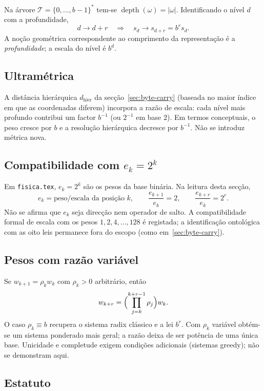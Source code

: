 \documentclass[11pt,a4paper]{article}
\begin{document}
Na árvore \(\mathcal T=\{0,\dots,b-1\}^*\) tem-se \(\operatorname{depth}(\omega)=|\omega|\). Identificando o nível \(d\) com a profundidade,
\[
d\to d+r\quad\Longrightarrow\quad s_d\to s_{d+r}=b^r s_d.
\]
A noção geométrica correspondente ao comprimento da representação é a \emph{profundidade}; a escala do nível é \(b^d\).

\subsection{Ultramétrica}

A distância hierárquica \(d_{\mathrm{hier}}\) da secção~\ref{sec:byte-carry} (baseada no maior índice em que as coordenadas diferem) incorpora a razão de escala: cada nível mais profundo contribui um factor \(b^{-1}\) (ou \(2^{-1}\) em base \(2\)). Em termos conceptuais, o peso cresce por \(b\) e a resolução hierárquica decresce por \(b^{-1}\). Não se introduz métrica nova.

\subsection{Compatibilidade com \(e_k=2^k\)}

Em \texttt{fisica.tex}, \(e_k=2^k\) são os pesos da base binária. Na leitura desta secção,
\[
e_k=\text{peso/escala da posição }k,\qquad
\frac{e_{k+1}}{e_k}=2,\qquad
\frac{e_{k+r}}{e_k}=2^r.
\]
Não se afirma que \(e_k\) seja direcção nem operador de salto. A compatibilidade formal de escala com os pesos \(1,2,4,\dots,128\) é registada; a identificação ontológica com as oito leis permanece fora do escopo (como em~\ref{sec:byte-carry}).

\subsection{Pesos com razão variável}

Se \(w_{k+1}=\rho_k w_k\) com \(\rho_k>0\) arbitrário, então
\[
w_{k+r}=\Bigl(\prod_{j=k}^{k+r-1}\rho_j\Bigr)w_k.
\]
O caso \(\rho_k\equiv b\) recupera o sistema radix clássico e a lei \(b^r\). Com \(\rho_k\) variável obtém-se um sistema ponderado mais geral; a razão deixa de ser potência de uma única base. Unicidade e completude exigem condições adicionais (sistemas greedy); não se demonstram aqui.

\subsection{Estatuto}
\end{document}
